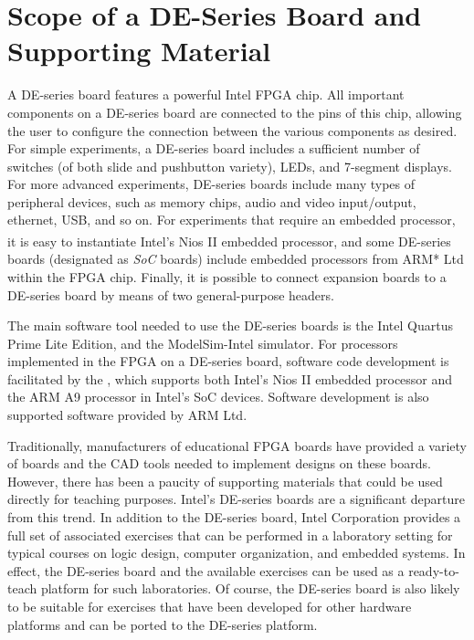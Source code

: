 \documentclass[11pt, twoside, pdftex]{article}
\begin{document}
\section{Scope of a DE-Series Board and Supporting Material}

A DE-series board features a powerful Intel FPGA chip.
All important components on a DE-series board are connected to the pins of this chip, 
allowing the user to configure the connection between the 
various components as desired.
For simple experiments, a DE-series board includes a sufficient number of switches
(of both slide and pushbutton variety), LEDs, and 7-segment displays.
For more advanced experiments, DE-series boards include many types of peripheral devices,
such as memory chips, audio and video input/output, ethernet, USB, and so on.
For experiments that require an embedded processor, it is easy to instantiate Intel's 
Nios\textsuperscript{\textregistered}  II embedded processor, and some DE-series boards (designated as {\it SoC} boards) include
embedded processors from ARM* Ltd within the FPGA chip. 
Finally, it is possible to connect expansion boards to a DE-series board
by means of two general-purpose headers.

The main software tool needed to use the DE-series boards is the Intel Quartus Prime Lite
Edition, and the ModelSim-Intel simulator.  For processors implemented in the FPGA on a
DE-series board, software code development is facilitated by the \productNameMed{}, 
which supports both Intel's Nios II embedded processor and the ARM A9 processor in
Intel's SoC devices.  Software development is also supported 
software provided by ARM Ltd.

Traditionally, manufacturers of educational FPGA boards have provided a variety
of boards and the CAD tools needed to implement designs on these boards.
However, there has been a paucity of supporting materials that could be used
directly for teaching purposes. Intel's DE-series boards are a significant departure from
this trend. In addition to the DE-series board, Intel Corporation provides a full set
of associated exercises that can be performed in a laboratory setting for typical
courses on logic design, computer organization, and embedded systems. In effect, the 
DE-series board and the available exercises can be used as a ready-to-teach platform for such
laboratories. Of course, the DE-series board is also likely to be suitable for exercises
that have been developed for other hardware platforms and can be ported
to the DE-series platform.
\end{document}
